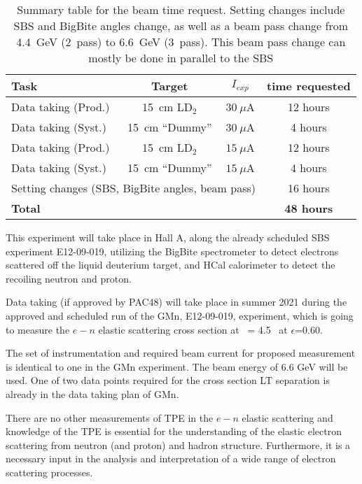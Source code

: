 \begin{table}[h]
\centering
\begin{tabular}{|l|c|c|c|}
\hline
Task & Target & $I_{exp}$ & time requested \\
\hline
Data taking (Prod.) & 15~cm LD$_2$ & $30~\mu$A & 12 hours \\ 
\hline
Data taking (Syst.) & 15~cm ``Dummy'' & $30~\mu$A & 4 hours \\ 
\hline
Data taking (Prod.) & 15~cm LD$_2$ & $15~\mu$A & 12 hours \\ 
\hline
Data taking (Syst.) & 15~cm ``Dummy'' & $15~\mu$A & 4 hours \\ 
\hline
\multicolumn{3}{|l|}{Setting changes (SBS, BigBite angles, beam pass)} & 16 hours \\
\hline
\hline
\multicolumn{3}{|l|}{\bf Total} & {\bf 48 hours} \\ %
\hline
\end{tabular} 
\caption{Summary table for the beam time request. Setting changes include SBS and BigBite angles change, as well as a beam pass change from 4.4~GeV (2~pass) to 6.6~GeV (3~pass). This beam pass change can mostly be done in parallel to the SBS}%
\label{tab:beamtime}
\end{table}

This experiment will take place in Hall A, along the already scheduled SBS \gmn experiment E12-09-019, utilizing the BigBite spectrometer to detect electrons scattered off 
the liquid deuterium target, and HCal calorimeter to detect the recoiling neutron and proton.

Data taking (if approved by PAC48) will take place in summer 2021 during the approved and scheduled run of the GMn, E12-09-019, experiment,
which is going to measure the $e-n$ elastic scattering cross section at \qsq~= 4.5 \gevcsq~at $\epsilon$=0.60.

The set of instrumentation and required beam current for proposed measurement is identical to one in the GMn experiment.
The beam energy of 6.6 GeV will be used.
One of two data points required for the cross section LT separation is already in the data taking plan of GMn.

There are no other measurements of TPE in the $e-n$ elastic scattering and knowledge of the TPE is essential for the understanding 
of the elastic electron scattering from neutron (and proton) and hadron structure.  
Furthermore, it is a necessary input in the analysis and interpretation of a wide range of electron scattering processes. 

